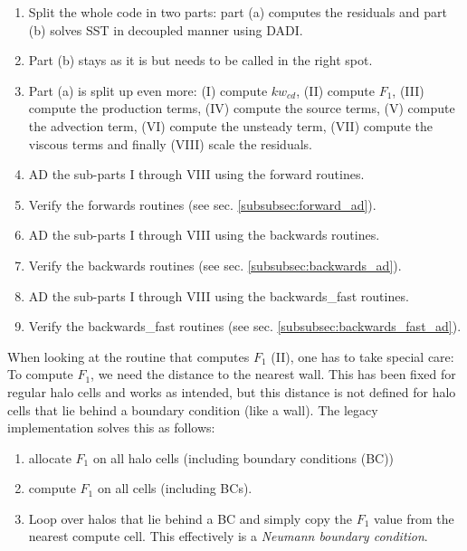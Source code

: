 \begin{enumerate}
    \item Split the whole code in two parts: part (a) computes the residuals
        and part (b) solves SST in decoupled manner using DADI. 

    \item Part (b) stays as it is but needs to be called in the right spot.

    \item Part (a) is split up even more: (I) compute $kw_{cd}$, (II) compute
        $F_1$, (III) compute the production terms, (IV) compute the source
        terms, (V) compute the advection term, (VI) compute the unsteady term,
        (VII) compute the viscous terms and finally (VIII) scale the residuals.

    \item AD the sub-parts I through VIII using the forward routines. 

    \item Verify the forwards routines (see sec. \ref{subsubsec:forward_ad}).

    \item AD the sub-parts I through VIII using the backwards routines.

    \item Verify the backwards routines (see sec. \ref{subsubsec:backwards_ad}).

    \item AD the sub-parts I through VIII using the backwards\_fast routines.

    \item Verify the backwards\_fast routines (see sec.
        \ref{subsubsec:backwards_fast_ad}).
\end{enumerate}

\noindent When looking at the routine that computes $F_1$ (II), one has to take
special care: To compute $F_1$, we need the distance to the nearest wall. This
has been fixed for regular halo cells and works as intended, but this distance
is not defined for halo cells that lie behind a boundary condition (like a
wall). The legacy implementation solves this as follows:

\begin{enumerate}
    \item allocate $F_1$ on all halo cells (including boundary conditions (BC))

    \item compute $F_1$ on all cells (including BCs).

    \item Loop over halos that lie behind a BC and simply copy the $F_1$ value
        from the nearest compute cell. This effectively is a \textit{Neumann
        boundary condition}.
\end{enumerate}

